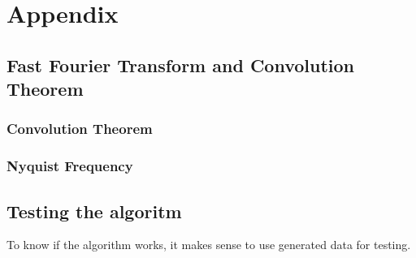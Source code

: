 \documentclass[a4paper, 10pt, conference]{ieeeconf}      %
\begin{document}
\section{Appendix}
\subsection{Fast Fourier Transform and Convolution Theorem}
\subsubsection{Convolution Theorem}{\label{convolution}}
\subsubsection{Nyquist Frequency}
\subsection{Testing the algoritm}
To know if the algorithm works, it makes sense to use generated data for testing.
\end{document}
